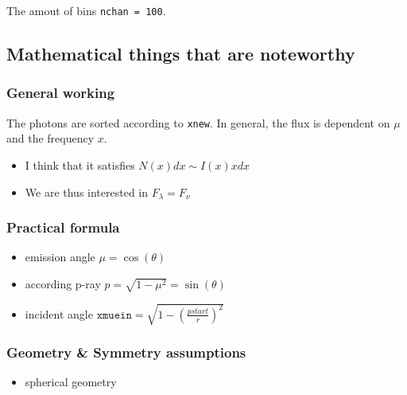 \documentclass[../main/main.tex]{subfiles}
\begin{document}
The amout of bins \texttt{nchan = 100}.


\newpage
\subsection{Mathematical things that are noteworthy}

\subsubsection{General working}
\begin{center}
\end{center}
The photons are sorted according to \texttt{xnew}.
In general, the flux is dependent on $\mu$ and the frequency $x$.


\begin{itemize}
\item I think that it satisfies $N(x)dx \sim I(x)xdx$
\item We are thus interested in $F_{\lambda} = F_{\nu}$
\end{itemize}


\subsubsection{Practical formula}
\begin{itemize}
\item emission angle $\mu = \cos(\theta)$
\item according p-ray $p = \sqrt{1-\mu^2} = \sin(\theta)$
\item incident angle $\texttt{xmuein} = \sqrt{1-\left(\frac{pstart}{r}\right)^2}$
\end{itemize}

\subsubsection{Geometry \& Symmetry assumptions}
\begin{itemize}
\item spherical geometry
\end{itemize}
\end{document}
